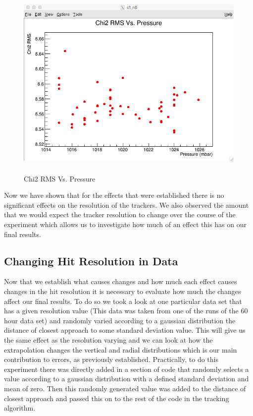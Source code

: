 \documentclass[./Thesis]{subfiles}
\begin{document}
\begin{figure}
	\centerline{\includegraphics[height=95mm]{Chi2RMSVsPressure.png}}
	\caption[Chi2 RMS Vs. Pressure]{Chi2 RMS Vs. Pressure}
	\label{fig:chiRMSPres}
\end{figure}
	

	 
	 Now we have shown that for the effects that were established there is no significant effects on the resolution of the trackers. We also observed the amount that we would expect the tracker resolution to change over the course of the experiment which allows us to investigate how much of an effect this has on our final results.
	
\subsection{Changing Hit Resolution in Data}

		Now that we establish what causes changes and how much each effect causes changes in the hit resolution it is necessary to evaluate how much the changes affect our final results. To do so we took a look at one particular data set that has a given resolution value (This data was taken from one of the runs of the 60 hour data set) and randomly varied according to a gaussian distribution the distance of closest approach to some standard deviation value. This will give us the same effect as the resolution varying and we can look at how the extrapolation changes the vertical and radial distributions which is our main contribution to errors, as previously established. Practically, to do this experiment there was directly added in a section of code that randomly selects a value according to a gaussian distribution with a defined standard deviation and mean of zero. Then this randomly generated value was added to the distance of closest approach and passed this on to the rest of the code in the tracking algorithm. 
		
\end{document}
